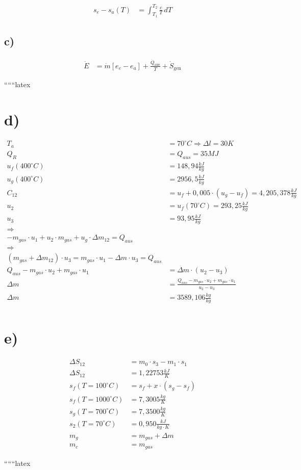 \begin{align*}
s_e - s_a (T) &= \int_{T_1}^{T_2} \frac{c}{T} \, dT
\end{align*}

\subsection*{c)}

\begin{align*}
\dot{E} &= \dot{m} \left[ e_e - e_a \right] + \frac{\dot{Q}_{\text{aus}}}{T} + \dot{S}_{\text{gen}}
\end{align*}

``````latex


\section*{d)}

\begin{align*}
T_a &= 70^\circ C \Rightarrow \Delta l = 30 K \\
Q_R &= Q_{aus} = 35 MJ \\
u_f(400^\circ C) &= 148,94 \frac{kJ}{kg} \\
u_g(400^\circ C) &= 2956,5 \frac{kJ}{kg} \\
C_{12} &= u_f + 0,005 \cdot (u_g - u_f) = 4,205,378 \frac{kJ}{kg} \\
u_2 &= u_f(70^\circ C) = 293,25 \frac{kJ}{kg} \\
u_3 &= 93,95 \frac{kJ}{kg} \\
\Rightarrow & \\
-m_{gas} \cdot u_1 + u_2 \cdot m_{gas} + u_g \cdot \Delta m_{12} = Q_{aus} \\
\Rightarrow & \\
(m_{gas} + \Delta m_{12}) \cdot u_3 = m_{gas} \cdot u_1 - \Delta m \cdot u_3 = Q_{aus} \\
Q_{aus} - m_{gas} \cdot u_2 + m_{gas} \cdot u_1 &= \Delta m \cdot (u_2 - u_3) \\
\Delta m &= \frac{Q_{aus} - m_{gas} \cdot u_2 + m_{gas} \cdot u_1}{u_2 - u_3} \\
\Delta m &= 3589,106 \frac{kg}{kg} \\
\end{align*}

\section*{e)}

\begin{align*}
\Delta S_{12} &= m_0 \cdot s_3 - m_1 \cdot s_1 \\
\Delta S_{12} &= 1,22753 \frac{kJ}{K} \\
s_f(T = 100^\circ C) &= s_f + x \cdot (s_g - s_f) \\
s_f(T = 1000^\circ C) &= 7,3005 \frac{kg}{K} \\
s_g(T = 700^\circ C) &= 7,3500 \frac{kg}{K} \\
s_2(T = 70^\circ C) &= 0,950 \frac{kJ}{kg \cdot K} \\
m_g &= m_{gas} + \Delta m \\
m_c &= m_{gas}
\end{align*}

``````latex


